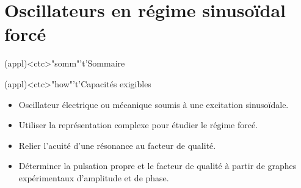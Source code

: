\documentclass[../../main/main.tex]{subfiles}
\begin{document}
\setcounter{chapter}{6}


\chapter{Oscillateurs en régime sinusoïdal forcé}

\vspace*{\fill}

\begin{tcn}(appl)<ctc>"somm"'t'{Sommaire}
	\let\item\olditem
	\vspace{-15pt}
	\minitoc
	\vspace{-25pt}
\end{tcn}

\begin{tcn}[sidebyside](appl)<ctc>"how"'t'{Capacités exigibles}
	\begin{itemize}[label=\rcheck]
		\item Oscillateur électrique ou mécanique soumis à une excitation
		      sinusoïdale.
		\item Utiliser la représentation complexe pour étudier le régime forcé.
	\end{itemize}
	\tcblower
	\begin{itemize}[label=\rcheck]
		\item Relier l'acuité d'une résonance au facteur de qualité.
		\item Déterminer la pulsation propre et le facteur de qualité à partir de
		      graphes expérimentaux d’amplitude et de phase.
	\end{itemize}
\end{tcn}

\vspace{-20pt}

\end{document}
